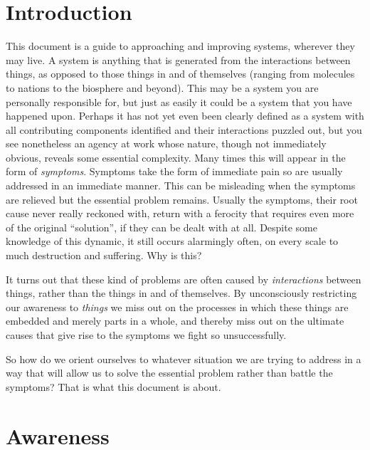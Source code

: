\documentclass[11pt]{article}
\begin{document}
\maketitle

\section{Introduction}

This document is a guide to approaching and improving systems, wherever they may live.  A system is anything that is generated from the interactions between things, as opposed to those things in and of themselves (ranging from molecules to nations to the biosphere and beyond).  This may be a system you are personally responsible for, but just as easily it could be a system that you have happened upon.  Perhaps it has not yet even been clearly defined as a system with all contributing components identified and their interactions puzzled out, but you see nonetheless an agency at work whose nature, though not immediately obvious, reveals some essential complexity.  Many times this will appear in the form of \emph{symptoms}.  Symptoms take the form of immediate pain so are usually addressed in an immediate manner.  This can be misleading when the symptoms are relieved but the essential problem remains.  Usually the symptoms, their root cause never really reckoned with, return with a ferocity that requires even more of the original ``solution'', if they can be dealt with at all.  Despite some knowledge of this dynamic, it still occurs alarmingly often, on every scale to much destruction and suffering.  Why is this?  

It turns out that these kind of problems are often caused by \emph{interactions} between things, rather than the things in and of themselves.  By unconsciously restricting our awareness to \emph{things} we miss out on the processes in which these things are embedded and merely parts in a whole, and thereby miss out on the ultimate causes that give rise to the symptoms we fight so unsuccessfully.

So how do we orient ourselves to whatever situation we are trying to address in a way that will allow us to solve the essential problem rather than battle the symptoms?  That is what this document is about.

\section{Awareness}
\end{document}
